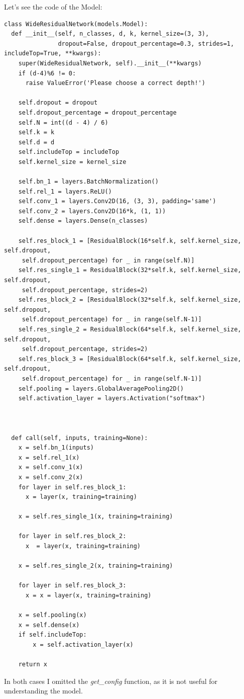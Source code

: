 Let's see the code of the Model:
\lstset{language=Python}
\lstset{frame=lines}
\lstset{basicstyle=\footnotesize}
\begin{lstlisting}
class WideResidualNetwork(models.Model):
  def __init__(self, n_classes, d, k, kernel_size=(3, 3),
               dropout=False, dropout_percentage=0.3, strides=1, includeTop=True, **kwargs):
    super(WideResidualNetwork, self).__init__(**kwargs)
    if (d-4)%6 != 0:
      raise ValueError('Please choose a correct depth!')
    
    self.dropout = dropout
    self.dropout_percentage = dropout_percentage
    self.N = int((d - 4) / 6)
    self.k = k
    self.d = d
    self.includeTop = includeTop
    self.kernel_size = kernel_size

    self.bn_1 = layers.BatchNormalization()
    self.rel_1 = layers.ReLU()
    self.conv_1 = layers.Conv2D(16, (3, 3), padding='same')
    self.conv_2 = layers.Conv2D(16*k, (1, 1))
    self.dense = layers.Dense(n_classes)

    self.res_block_1 = [ResidualBlock(16*self.k, self.kernel_size, self.dropout,
     self.dropout_percentage) for _ in range(self.N)]
    self.res_single_1 = ResidualBlock(32*self.k, self.kernel_size, self.dropout,
     self.dropout_percentage, strides=2)
    self.res_block_2 = [ResidualBlock(32*self.k, self.kernel_size, self.dropout,
     self.dropout_percentage) for _ in range(self.N-1)]
    self.res_single_2 = ResidualBlock(64*self.k, self.kernel_size, self.dropout,
     self.dropout_percentage, strides=2)
    self.res_block_3 = [ResidualBlock(64*self.k, self.kernel_size, self.dropout,
     self.dropout_percentage) for _ in range(self.N-1)]
    self.pooling = layers.GlobalAveragePooling2D()
    self.activation_layer = layers.Activation("softmax")



  def call(self, inputs, training=None):
    x = self.bn_1(inputs)
    x = self.rel_1(x)
    x = self.conv_1(x)
    x = self.conv_2(x)
    for layer in self.res_block_1:
      x = layer(x, training=training)

    x = self.res_single_1(x, training=training)

    for layer in self.res_block_2:
      x  = layer(x, training=training)

    x = self.res_single_2(x, training=training)

    for layer in self.res_block_3:
      x = x = layer(x, training=training)

    x = self.pooling(x)
    x = self.dense(x)
    if self.includeTop:
        x = self.activation_layer(x)

    return x

\end{lstlisting}

In both cases I omitted the \textit{get\_config} function, as it is not useful for understanding the model.